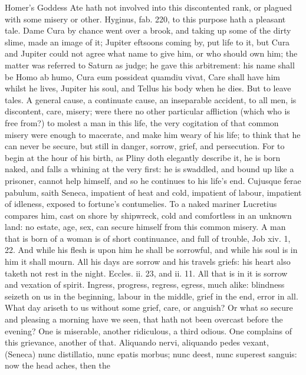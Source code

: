 {Homer's Goddess Ate hath not involved into this discontented
rank, or plagued with some misery or other. Hyginus, fab. 220, to
this purpose hath a pleasant tale. Dame Cura by chance went over a
brook, and taking up some of the dirty slime, made an image of it;
Jupiter eftsoons coming by, put life to it, but Cura and Jupiter could
not agree what name to give him, or who should own him; the matter was
referred to Saturn as judge; he gave this arbitrement: his name shall
be Homo ab humo, Cura eum possideat quamdiu vivat, Care shall have him
whilst he lives, Jupiter his soul, and Tellus his body when he dies.
But to leave tales. A general cause, a continuate cause, an inseparable
accident, to all men, is discontent, care, misery; were there no other
particular affliction (which who is free from?) to molest a man in this
life, the very cogitation of that common misery were enough to
macerate, and make him weary of his life; to think that he can never be
secure, but still in danger, sorrow, grief, and persecution. For to
begin at the hour of his birth, as Pliny doth elegantly describe
it, he is born naked, and falls a whining at the very first: he
is swaddled, and bound up like a prisoner, cannot help himself, and so
he continues to his life's end. Cujusque ferae pabulum, saith
Seneca, impatient of heat and cold, impatient of labour,
impatient of idleness, exposed to fortune's contumelies. To a naked
mariner Lucretius compares him, cast on shore by shipwreck, cold and
comfortless in an unknown land: no estate, age, sex, can secure
himself from this common misery. A man that is born of a woman is of
short continuance, and full of trouble, Job xiv. 1, 22. And while his
flesh is upon him he shall be sorrowful, and while his soul is in him
it shall mourn. All his days are sorrow and his travels griefs: his
heart also taketh not rest in the night. Eccles. ii. 23, and ii. 11.
All that is in it is sorrow and vexation of spirit. Ingress,
progress, regress, egress, much alike: blindness seizeth on us in the
beginning, labour in the middle, grief in the end, error in all. What
day ariseth to us without some grief, care, or anguish? Or what so
secure and pleasing a morning have we seen, that hath not been overcast
before the evening? One is miserable, another ridiculous, a third
odious. One complains of this grievance, another of that. Aliquando
nervi, aliquando pedes vexant, (Seneca) nunc distillatio, nunc epatis
morbus; nunc deest, nunc superest sanguis: now the head aches, then the
}
